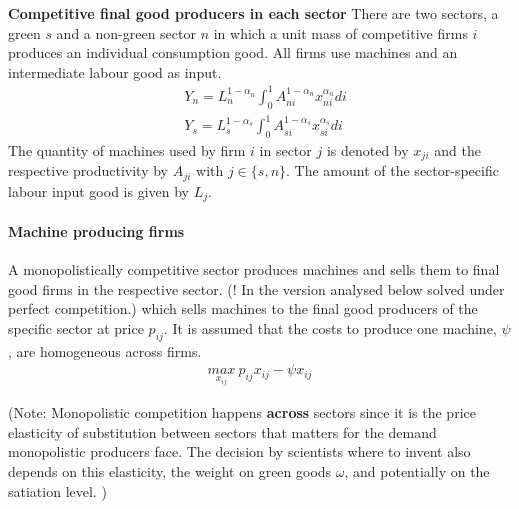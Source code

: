 \noindent\textbf{Competitive final good producers in each sector}
There are two sectors, a green $s$ and a non-green sector $n$ in which a unit mass of competitive firms $i$ produces an individual consumption good. All firms use machines and an intermediate labour good as input. 
\begin{align*}
&Y_n= L_n^{1-\alpha_n}\int_{0}^{1}A_{ni}^{1-\alpha_n}x_{ni}^{\alpha_n} di\\
&Y_s= L_s^{1-\alpha_s}\int_{0}^{1}A_{si}^{1-\alpha_s}x_{si}^{\alpha_s} di
\end{align*}
The quantity of machines used by firm $i$ in sector $j$ is denoted by $x_{ji}$ and the respective productivity by $A_{ji}$ with $j\in\{s,n\}$. The amount of the sector-specific labour input good is given by $L_j$.


\paragraph{Machine producing firms}

A monopolistically competitive sector produces machines and sells them to final good firms in the respective sector. (! In the version analysed below solved under perfect competition.) which sells machines to the final good producers of the specific sector at price $p_{ij}$. It is assumed that the costs to produce one machine, $\psi$, are homogeneous across firms.
\begin{align*}
\underset{x_{ij}}{max}\  p_{ij}x_{ij}-\psi x_{ij}
\end{align*}

(Note: Monopolistic competition happens \textbf{across} sectors since it is the price elasticity of substitution between sectors that matters for the demand monopolistic producers face.
The decision by scientists where to invent also depends on this elasticity, the weight on green goods $\omega$, and potentially on the satiation level. 
)
